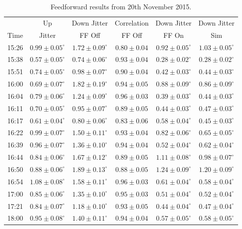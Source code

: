 \begin{table}
  \begin{center}
    \begin{tabular}{ c  c  c  c  c  c  }
	   \hline
	           & Up  & Down Jitter & Correlation  & Down Jitter  & Down Jitter \\
       Time & Jitter &  FF Off &  FF Off &  FF On &  Sim \\ \hline
15:26 & \(0.99\pm0.05^\circ\) & \(1.72\pm0.09^\circ\) & \(0.80\pm0.04\) & \(0.92\pm0.05^\circ\) & \(1.03\pm0.05^\circ\) \\
15:38 & \(0.57\pm0.05^\circ\) & \(0.74\pm0.06^\circ\) & \(0.93\pm0.04\) & \(0.28\pm0.02^\circ\) & \(0.28\pm0.02^\circ\) \\
15:51 & \(0.74\pm0.05^\circ\) & \(0.98\pm0.07^\circ\) & \(0.90\pm0.04\) & \(0.42\pm0.03^\circ\) & \(0.44\pm0.03^\circ\) \\
16:00 & \(0.69\pm0.07^\circ\) & \(1.82\pm0.19^\circ\) & \(0.94\pm0.05\) & \(0.88\pm0.09^\circ\) & \(0.86\pm0.09^\circ\) \\
16:04 & \(0.79\pm0.06^\circ\) & \(1.24\pm0.09^\circ\) & \(0.96\pm0.03\) & \(0.39\pm0.03^\circ\) & \(0.44\pm0.03^\circ\) \\
16:11 & \(0.70\pm0.05^\circ\) & \(0.95\pm0.07^\circ\) & \(0.89\pm0.05\) & \(0.44\pm0.03^\circ\) & \(0.47\pm0.03^\circ\) \\
16:17 & \(0.61\pm0.04^\circ\) & \(0.80\pm0.06^\circ\) & \(0.83\pm0.06\) & \(0.58\pm0.04^\circ\) & \(0.45\pm0.03^\circ\) \\
16:22 & \(0.99\pm0.07^\circ\) & \(1.50\pm0.11^\circ\) & \(0.93\pm0.04\) & \(0.82\pm0.06^\circ\) & \(0.65\pm0.05^\circ\) \\
16:39 & \(0.96\pm0.07^\circ\) & \(1.36\pm0.10^\circ\) & \(0.94\pm0.04\) & \(0.52\pm0.04^\circ\) & \(0.62\pm0.04^\circ\) \\
16:44 & \(0.84\pm0.06^\circ\) & \(1.67\pm0.12^\circ\) & \(0.89\pm0.05\) & \(1.11\pm0.08^\circ\) & \(0.98\pm0.07^\circ\) \\
16:50 & \(0.88\pm0.06^\circ\) & \(1.89\pm0.13^\circ\) & \(0.88\pm0.05\) & \(1.24\pm0.09^\circ\) & \(1.20\pm0.09^\circ\) \\
16:54 & \(1.08\pm0.08^\circ\) & \(1.58\pm0.11^\circ\) & \(0.96\pm0.03\) & \(0.61\pm0.04^\circ\) & \(0.58\pm0.04^\circ\) \\
17:00 & \(0.85\pm0.06^\circ\) & \(1.35\pm0.10^\circ\) & \(0.95\pm0.03\) & \(0.51\pm0.04^\circ\) & \(0.52\pm0.04^\circ\) \\
17:21 & \(0.84\pm0.07^\circ\) & \(1.18\pm0.10^\circ\) & \(0.93\pm0.05\) & \(0.44\pm0.04^\circ\) & \(0.47\pm0.04^\circ\) \\
18:00 & \(0.95\pm0.08^\circ\) & \(1.40\pm0.11^\circ\) & \(0.94\pm0.04\) & \(0.57\pm0.05^\circ\) & \(0.58\pm0.05^\circ\) \\
    \end{tabular}
    \caption{Feedforward results from 20th November 2015.}
  	\label{t:LongFFIndiv}
  \end{center}
\end{table}

